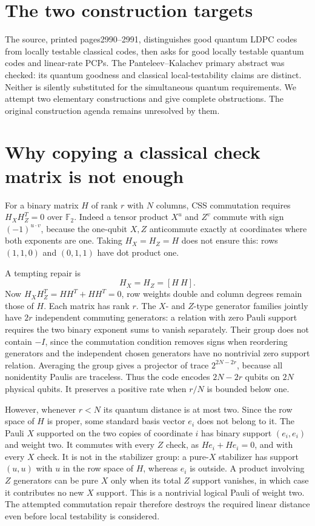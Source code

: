 \documentclass[11pt]{article}
\begin{document}
\section{The two construction targets}
The source, printed pages2990--2991, distinguishes good quantum
LDPC codes from locally testable classical codes, then asks for
good locally testable quantum codes and linear-rate PCPs.
The Panteleev--Kalachev primary abstract was checked: its quantum
goodness and classical local-testability claims are distinct.
Neither is silently substituted for the simultaneous quantum
requirements. We attempt two elementary constructions and give
complete obstructions. The original construction agenda remains
unresolved by them.

\section{Why copying a classical check matrix is not enough}
For a binary matrix $H$ of rank $r$ with $N$ columns, CSS
commutation requires $H_XH_Z^T=0$ over $\mathbb F_2$.
Indeed a tensor product $X^u$ and $Z^v$ commute with sign
$(-1)^{u\cdot v}$, because the one-qubit $X,Z$ anticommute
exactly at coordinates where both exponents are one.
Taking $H_X=H_Z=H$ does not ensure this: rows
$(1,1,0)$ and $(0,1,1)$ have dot product one.

A tempting repair is
\[
 H_X=H_Z=[H\ H].
\]
Now $H_XH_Z^T=HH^T+HH^T=0$, row weights double and
column degrees remain those of $H$. Each matrix has rank $r$.
The $X$- and $Z$-type generator families jointly have $2r$
independent commuting generators: a relation with zero Pauli
support requires the two binary exponent sums to vanish
separately. Their group does not contain $-I$, since the
commutation condition removes signs when reordering generators
and the independent chosen generators have no nontrivial zero
support relation. Averaging the group gives a projector of
trace $2^{2N-2r}$, because all nonidentity Paulis are traceless.
Thus the code encodes $2N-2r$ qubits on $2N$ physical qubits.
It preserves a positive rate when $r/N$ is bounded below one.

However, whenever $r<N$ its quantum distance is at most two.
Since the row space of $H$ is proper, some standard basis
vector $e_i$ does not belong to it. The Pauli $X$ supported
on the two copies of coordinate $i$ has binary support
$(e_i,e_i)$ and weight two. It commutes with every $Z$ check,
as $He_i+He_i=0$, and with every $X$ check. It is not in the
stabilizer group: a pure-$X$ stabilizer has support $(u,u)$
with $u$ in the row space of $H$, whereas $e_i$ is outside.
A product involving $Z$ generators can be pure $X$ only when
its total $Z$ support vanishes, in which case it contributes
no new $X$ support. This is a nontrivial logical Pauli of weight
two. The attempted commutation repair therefore destroys the
required linear distance even before local testability is considered.
\end{document}
